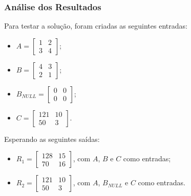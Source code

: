 \documentclass{beamer}
\begin{document}
    \begin{frame}
        \frametitle{Análise dos Resultados}

        \begingroup
        Para testar a solução, foram criadas as seguintes entradas:

        \begin{itemize}
            \item $ A = \begin{bmatrix} 1 & 2 \\ 3 & 4 \end{bmatrix} $;
            \item $ B = \begin{bmatrix} 4 & 3 \\ 2 & 1 \end{bmatrix} $;
            \item $ B_{NULL} = \begin{bmatrix} 0 & 0 \\ 0 & 0 \end{bmatrix} $;
            \item $ C = \begin{bmatrix} 121 & 10 \\ 50 & 3 \end{bmatrix} $.
        \end{itemize}
        \endgroup

        \begingroup
        Esperando as seguintes saídas:
        \begin{itemize}
            \item $ R_1 = \begin{bmatrix} 128 & 15 \\ 70 & 16 \end{bmatrix} $,
                  com $ A $, $ B $ e $ C $ como entradas;
            \item $ R_2 = \begin{bmatrix} 121 & 10 \\ 50 & 3 \end{bmatrix} $,
                  com $ A $, $ B_{NULL} $ e $ C $ como entradas.
        \end{itemize}
        \endgroup

    \end{frame}
\end{document}
